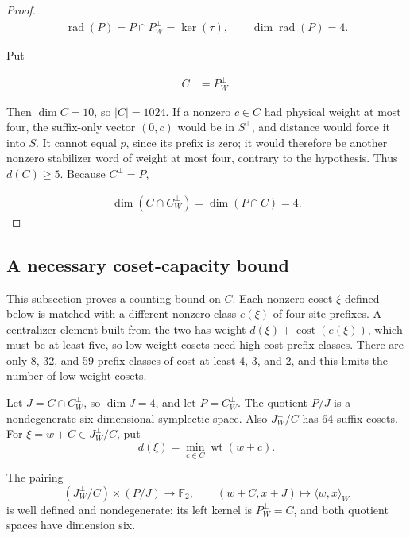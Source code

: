 \documentclass[11pt]{article}
\begin{document}
\begin{proof}
\[
\begin{aligned}
\operatorname{rad}(P)=P \cap P^\perp_{W}=\operatorname{ker}(\tau),\qquad \dim \operatorname{rad}(P)=4.
\end{aligned}
\]

Put

\[
\begin{aligned}
C &=P^\perp_{W}.
\end{aligned}
\]

Then \(\dim C=10\), so \(\lvert C\rvert=1024\). If a nonzero \(c \in C\) had physical weight at most four, the suffix-only vector \((0,c)\) would be in \(S^\perp\), and distance would force it into \(S\). It cannot equal \(p\), since its prefix is zero; it would therefore be another nonzero stabilizer word of weight at most four, contrary to the hypothesis. Thus \(d(C) \geq 5\). Because \(C^\perp=P\),

\[
\begin{aligned}
\dim(C \cap C^\perp_{W})=\dim(P \cap C)=4.
\end{aligned}
\]
\end{proof}

\subsection{A necessary coset-capacity bound}\label{a-necessary-coset-capacity-bound}

This subsection proves a counting bound on \(C\). Each nonzero coset \(\xi\) defined below is matched with a different nonzero class \(e(\xi)\) of four-site prefixes. A centralizer element built from the two has weight \(d(\xi)+\operatorname{cost}(e(\xi))\), which must be at least five, so low-weight cosets need high-cost prefix classes. There are only 8, 32, and 59 prefix classes of cost at least 4, 3, and 2, and this limits the number of low-weight cosets.


Let \(J=C \cap C^\perp_{W}\), so \(\dim J=4\), and let \(P=C^\perp_{W}\). The quotient \(P/J\) is a nondegenerate six-dimensional symplectic space. Also \(J^\perp_{W}/C\) has 64 suffix cosets. For \(\xi=w+C\in J^\perp_{W}/C\), put
\[
d(\xi)=\min_{c\in C}\operatorname{wt}(w+c).
\]
\begin{minipage}{\linewidth}
The pairing
\[
(J^\perp_{W}/C)\times(P/J)\longrightarrow\mathbb{F}_{2},
\qquad
(w+C,x+J)\longmapsto\langle w,x\rangle_{W}
\]
is well defined and nondegenerate: its left kernel is \(P^\perp_{W}=C\), and both quotient spaces have dimension six.
\end{minipage}
\end{document}
